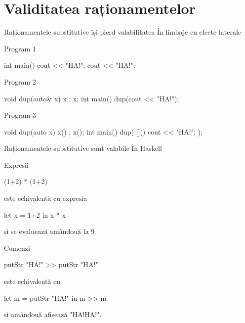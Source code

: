 \documentclass[xcolor=pdftex,romanian,colorlinks]{beamer}
\begin{document}
\section{Validitatea raționamentelor}

\begin{frame}[fragile]{Raționamentele substitutive își pierd valabilitatea}
{În limbaje cu efecte laterale}


\begin{block}
{Program 1}
\begin{asciic}
int main() { cout << "HA!"; cout << "HA!"; }
\end{asciic}
\end{block}

\begin{block}
{Program 2}
\begin{asciic}
void dup(auto& x) { x ; x; }
int main() { dup(cout << "HA!"); }
\end{asciic}
\end{block}

\begin{block}
{Program 3}
\begin{asciic}
void dup(auto x) { x() ; x(); }
int main() { dup( []() { cout << "HA!"; } ); }
\end{asciic}
\end{block}

\end{frame}

\begin{frame}[fragile]{Raționamentele substitutive sunt valabile}
{În Haskell}
\begin{block}{Expresii}
\begin{asciihs}
   (1+2) * (1+2)
\end{asciihs}
este echivalentă cu expresia
\begin{asciihs}
   let x = 1+2 in x * x
\end{asciihs}
și se evaluează amândouă la 9
\end{block}

\begin{block}{Comenzi}
\begin{asciihs}
   putStr "HA!" >> putStr "HA!"
\end{asciihs}
este echivalentă cu
\begin{asciihs}
   let m = putStr "HA!" in m >> m
\end{asciihs}
si amândouă afișează "HA!HA!".
\end{block}
\end{frame}
\end{document}
